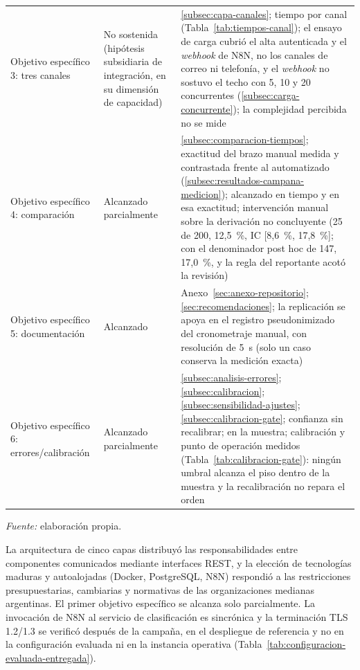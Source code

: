 \begin{table}[htbp]
\begin{tabular}{@{}>{\raggedright\arraybackslash}p{3.6cm} >{\raggedright\arraybackslash}p{2.2cm} >{\raggedright\arraybackslash}p{8.4cm}@{}}
Objetivo específico 3: tres canales & No sostenida (hipótesis subsidiaria de integración, en su dimensión de capacidad) & \autoref{subsec:capa-canales}; tiempo por canal (Tabla~\ref{tab:tiempos-canal}); el ensayo de carga cubrió el alta autenticada y el \emph{webhook} de N8N, no los canales de correo ni telefonía, y el \emph{webhook} no sostuvo el techo con 5, 10 y 20 concurrentes (\autoref{subsec:carga-concurrente}); la complejidad percibida no se mide \\
Objetivo específico 4: comparación & Alcanzado parcialmente & \autoref{subsec:comparacion-tiempos}; exactitud del brazo manual medida y contrastada frente al automatizado (\autoref{subsec:resultados-campana-medicion}); alcanzado en tiempo y en esa exactitud; intervención manual sobre la derivación no concluyente (25 de 200, 12,5~\%, IC [8,6~\%, 17,8~\%]; con el denominador post hoc de 147, 17,0~\%, y la regla del reportante acotó la revisión) \\
Objetivo específico 5: documentación & Alcanzado & Anexo~\ref{sec:anexo-repositorio}; \autoref{sec:recomendaciones}; la replicación se apoya en el registro pseudonimizado del cronometraje manual, con resolución de 5~s (solo un caso conserva la medición exacta) \\
Objetivo específico 6: errores/calibración & Alcanzado parcialmente & \autoref{subsec:analisis-errores}; \autoref{subsec:calibracion}; \autoref{subsec:sensibilidad-ajustes}; \autoref{subsec:calibracion-gate}; confianza sin recalibrar; en la muestra; calibración y punto de operación medidos (Tabla~\ref{tab:calibracion-gate}): ningún umbral alcanza el piso dentro de la muestra y la recalibración no repara el orden \\
\bottomrule
\end{tabular}
\par\smallskip
{\footnotesize\textit{Fuente:} elaboración propia.\par}
\end{table}

La arquitectura de cinco capas distribuyó las responsabilidades entre componentes comunicados mediante interfaces REST, y la elección de tecnologías maduras y autoalojadas (Docker, PostgreSQL, N8N) respondió a las restricciones presupuestarias, cambiarias y normativas de las organizaciones medianas argentinas. El primer objetivo específico se alcanza solo parcialmente. La invocación de N8N al servicio de clasificación es sincrónica y la terminación TLS 1.2/1.3 se verificó después de la campaña, en el despliegue de referencia y no en la configuración evaluada ni en la instancia operativa (Tabla~\ref{tab:configuracion-evaluada-entregada}).

